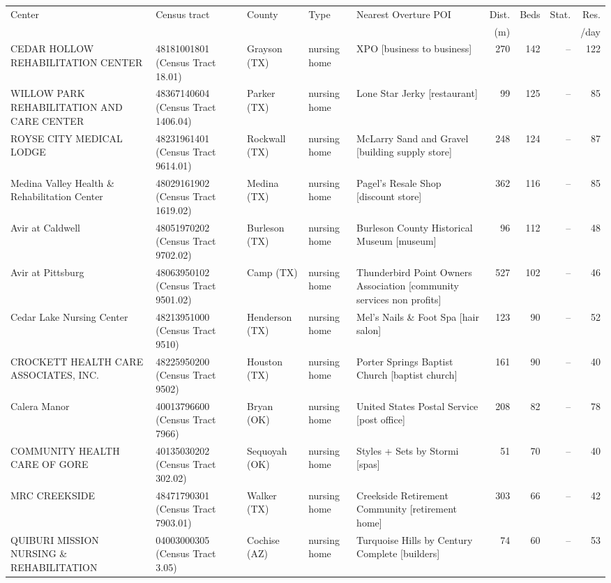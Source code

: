 \begin{tabular}{@{}p{4.1cm}p{3.0cm}p{1.9cm}lp{3.4cm}rrrr@{}}
\toprule
Center & Census tract & County & Type & Nearest Overture POI & Dist. & Beds & Stat. & Res. \\
 & & & & & (m) & & & /day \\
\midrule
CEDAR HOLLOW REHABILITATION CENTER & 48181001801 (Census Tract 18.01) & Grayson (TX) & nursing home & XPO [business to business] & 270 & 142 & -- & 122 \\
WILLOW PARK REHABILITATION AND CARE CENTER & 48367140604 (Census Tract 1406.04) & Parker (TX) & nursing home & Lone Star Jerky [restaurant] & 99 & 125 & -- & 85 \\
ROYSE CITY MEDICAL LODGE & 48231961401 (Census Tract 9614.01) & Rockwall (TX) & nursing home & McLarry Sand and Gravel [building supply store] & 248 & 124 & -- & 87 \\
Medina Valley Health \& Rehabilitation Center & 48029161902 (Census Tract 1619.02) & Medina (TX) & nursing home & Pagel's Resale Shop [discount store] & 362 & 116 & -- & 85 \\
Avir at Caldwell & 48051970202 (Census Tract 9702.02) & Burleson (TX) & nursing home & Burleson County Historical Museum [museum] & 96 & 112 & -- & 48 \\
Avir at Pittsburg & 48063950102 (Census Tract 9501.02) & Camp (TX) & nursing home & Thunderbird Point Owners Association [community services non profits] & 527 & 102 & -- & 46 \\
Cedar Lake Nursing Center & 48213951000 (Census Tract 9510) & Henderson (TX) & nursing home & Mel’s Nails \& Foot Spa [hair salon] & 123 & 90 & -- & 52 \\
CROCKETT HEALTH CARE ASSOCIATES, INC. & 48225950200 (Census Tract 9502) & Houston (TX) & nursing home & Porter Springs Baptist Church [baptist church] & 161 & 90 & -- & 40 \\
Calera Manor & 40013796600 (Census Tract 7966) & Bryan (OK) & nursing home & United States Postal Service [post office] & 208 & 82 & -- & 78 \\
COMMUNITY HEALTH CARE OF GORE & 40135030202 (Census Tract 302.02) & Sequoyah (OK) & nursing home & Styles + Sets by Stormi [spas] & 51 & 70 & -- & 40 \\
MRC CREEKSIDE & 48471790301 (Census Tract 7903.01) & Walker (TX) & nursing home & Creekside Retirement Community [retirement home] & 303 & 66 & -- & 42 \\
QUIBURI MISSION NURSING \& REHABILITATION & 04003000305 (Census Tract 3.05) & Cochise (AZ) & nursing home & Turquoise Hills by Century Complete [builders] & 74 & 60 & -- & 53 \\

\end{tabular}
